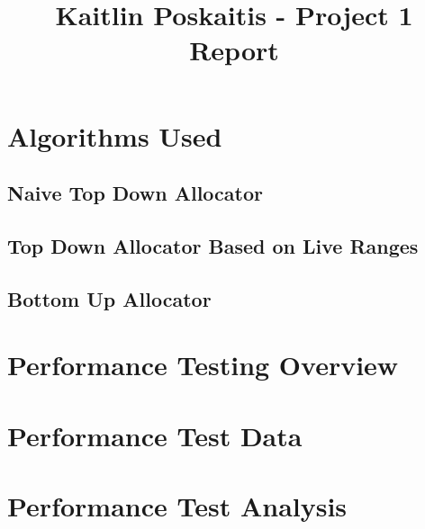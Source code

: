 \documentclass[12pt]{article}
\title{\bf Kaitlin Poskaitis - Project 1 Report}
\author{}
\date{}
\begin{document}
\maketitle


\section*{Algorithms Used}

    \subsection{Naive Top Down Allocator}

    \subsection{Top Down Allocator Based on Live Ranges}

    \subsection{Bottom Up Allocator}



\section*{Performance Testing Overview}



\section*{Performance Test Data}



\section*{Performance Test Analysis}
\end{document}

